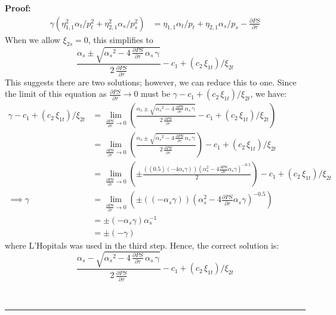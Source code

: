 \documentclass[12pt,a4paper]{extarticle}
\newenvironment{proof}[1][Proof]{\noindent\textbf{#1:} }{\ \rule{0.5em}{0.5em}}
\begin{document}
\begin{proof}
\begin{align*}
\gamma \left( \eta_{1,1}^2 \alpha_t / p_t^2 + \eta_{2,1}^2 \alpha_s / p_s^2 \right) &= \eta_{1,1} \alpha_t /p_t + \eta_{2,1} \alpha_s / p_s - \frac{\partial PS}{\partial \tau} 
\end{align*}
When we allow $\xi_{2s} = 0$, this simplifies to 
$$\frac{\alpha _{s}\pm\sqrt{{\alpha _{s}}^2-4\,\frac{\partial PS}{\partial \tau} \,\alpha _{s}\,\mathrm{\gamma}}}{2\,\frac{\partial PS}{\partial \tau} } - c_1 + (c_2\,\xi_{1t})/\xi_{2t}$$
This suggests there are two solutions; however, we can reduce this to one. Since the limit  of this equation as $\frac{\partial PS}{\partial \tau} \to 0$ must be $\gamma - c_1 + (c_2\,\xi_{1t})/\xi_{2t}$, we have:
\begin{align*}
\gamma - c_1 + (c_2\,\xi_{1t})/\xi_{2t} &= \lim_{\frac{\partial PS}{\partial \tau} \to 0} \left( \frac{\alpha _{s}\pm\sqrt{{\alpha _{s}}^2-4\,\frac{\partial PS}{\partial \tau} \,\alpha _{s}\,\mathrm{\gamma}}}{2\,\frac{\partial PS}{\partial \tau} } - c_1 + (c_2\,\xi_{1t})/\xi_{2t} \right) \\
&= \lim_{\frac{\partial PS}{\partial \tau} \to 0} \left( \frac{\alpha _{s}\pm\sqrt{{\alpha _{s}}^2-4\,\frac{\partial PS}{\partial \tau} \,\alpha _{s}\,\mathrm{\gamma}}}{2\,\frac{\partial PS}{\partial \tau} } \right) - c_1 + (c_2\,\xi_{1t})/\xi_{2t}  \\
&= \lim_{\frac{\partial PS}{\partial \tau} \to 0} \left( \pm 
\frac{\left( (0.5)(-4\alpha_s \gamma) \right) \left( \alpha_s^2 - 4 \frac{\partial PS}{\partial \tau} \alpha_s \gamma \right)^{-0.5} }{2}
 \right) - c_1 + (c_2\,\xi_{1t})/\xi_{2t}  \\
\implies \gamma &= \lim_{\frac{\partial PS}{\partial \tau} \to 0} \left( \pm 
\left( (-\alpha_s \gamma) \right) \left( \alpha_s^2 - 4 \frac{\partial PS}{\partial \tau} \alpha_s \gamma \right)^{-0.5} 
\right) \\
&=  \pm 
\left( -\alpha_s \gamma \right)\alpha_s^{-1} \\
&=  \pm (- \gamma)
\end{align*}
where L'Hopitals was used in the third step. Hence, the correct solution is:
$$\frac{\alpha _{s} - \sqrt{{\alpha _{s}}^2-4\,\frac{\partial PS}{\partial \tau} \,\alpha _{s}\,\mathrm{\gamma}}}{2\,\frac{\partial PS}{\partial \tau} } - c_1 + (c_2\,\xi_{1t})/\xi_{2t}$$

\end{proof}

\pagebreak



\pagebreak
\end{document}
